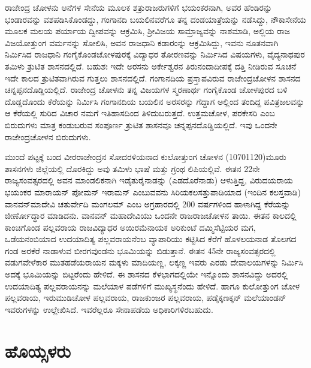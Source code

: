 ರಾಜೇಂದ್ರ ಚೋಳನು ಆನೆಗಳ ಸೇನೆಯ ಮೂಲಕ ಶತ್ರುರಾಜರುಗಳಿಗೆ ಭಯಂಕರನಾಗಿ, ಅವರ ಹೆಂಡಿರನ್ನು ಭಂಡಾರವನ್ನು ವಶಪಡಿಸಿಕೊಂಡದ್ದು, ಗಂಗಾನದಿ ಬಯಲಿನವರೆಗೂ ತನ್ನ ದಂಡಯಾತ್ರೆಯನ್ನು ನಡೆಸಿದ್ದು, ನೌಕಾಸೇನೆಯ ಮೂಲಕ ಮಲಯ ಪರ್ಯಾಯ ದ್ವೀಪವನ್ನು ಆಕ್ರಮಿಸಿ, ಶ‍್ರೀವಿಜಯ ಸಾಮ್ರಾಜ್ಯವನ್ನು ನಾಶಮಾಡಿ, ಅಲ್ಲಿಯ ರಾಜ ವಿಜಯೋತ್ತುಂಗ ವರ್ಮನನ್ನು ಸೋಲಿಸಿ, ಅವನ ರಾಜಧಾನಿ ಕಡಾರಂನ್ನು ಆಕ್ರಮಿಸಿದ್ದು, ಇವನು ನೂತನವಾಗಿ ನಿರ್ಮಿಸಿದ ರಾಜಧಾನಿ ಗಂಗೈಕೊಂಡಚೋಳಪುರಕ್ಕೆ ವಿದ್ಯಾಧರ ತೋರಣವನ್ನು ನಿರ್ಮಿಸಿದ ವಿಷಯಗಳು, ವೈದ್ಯನಾಥಪುರ ತಮಿಳು ತ್ರುಟಿತ ಶಾಸನ\-ದಲ್ಲಿದೆ. ಬಹುಶಃ ಇದೇ ಅರಸನು ಅರ್ಕೇಶ್ವರನ ತಿರುನಂದಾದೀಪಕ್ಕೆ ದತ್ತಿ ನೀಡಿರುವ ಸೂಚನೆ ಇದೇ ಕಾಲದ ತ್ರುಟಿತವಾಗಿರುವ ಗುತ್ತಲು ಶಾಸನದಲ್ಲಿದೆ. ಗಂಗಾನದಿಯ ಪ್ರಸ್ತಾಪವಿರುವ ರಾಜೇಂದ್ರಚೋಳನ ಶಾಸನದ ಚನ್ನಪ್ಪನದೊಡ್ಡಿಯಲ್ಲಿದೆ. ರಾಜೇಂದ್ರ ಚೋಳನು ತನ್ನ ವಿಜಯಗಳ ಸ್ಮರಣಾರ್ಥ ಗಂಗೈಕೊಂಡ ಚೋಳಪುರದ ಬಳಿ ದೊಡ್ಡದೊಂದು ಕೆರೆಯನ್ನು ನಿರ್ಮಿಸಿ ಗಂಗಾನದಿಯ ಬಯಲಿನ ಅರಸರನ್ನು ಗೆದ್ದಾಗ ಅಲ್ಲಿಂದ ತಂದಿದ್ದ ಪವಿತ್ರಜಲವನ್ನು ಆ ಕೆರೆಯಲ್ಲಿ ಸುರಿದ ವಿಚಾರ ನಮಗೆ ಇತಿಹಾಸದಿಂದ ತಿಳಿದುಬರುತ್ತದೆ. ಉತ್ತಮಚೋಳ, ಪರಕೇಸರಿ ಎಂಬ ಬಿರುದುಗಳು ಮಾತ್ರ ಕಂಡುಬರುವ ಸಂಪೂರ್ಣ ತ್ರುಟಿತ ಶಾಸನವೂ ಚನ್ನಪ್ಪನದೊಡ್ಡಿಯಲ್ಲಿದೆ. ಇವು ಒಂದನೇ ರಾಜೇಂದ್ರಚೋಳನ ಬಿರುದುಗಳು. 

ಮುಂದೆ ಪಟ್ಟಕ್ಕೆ ಬಂದ ವೀರರಾಜೇಂದ್ರನ ಸೋದರಳಿಯನಾದ ಕುಲೋತ್ತುಂಗ ಚೋಳನ (10701120)ಮೂರು ಶಾಸನಗಳು ಜಿಲ್ಲೆಯಲ್ಲಿ ದೊರಕಿದ್ದು ಅವು ತಮಿಳು ಭಾಷೆ ಮತ್ತು ಗ್ರಂಥ ಲಿಪಿಯಲ್ಲಿವೆ. ಈತನ 22ನೇ ರಾಜ್ಯಸಂವತ್ಸರದಲ್ಲಿ ಅವನ ಮಾಂಡಲಿಕನಾಗಿ ಇಡೈತುರೈನಾಡನ್ನು (ಎಡದೊರೆನಾಡು) ಆಳುತ್ತಿದ್ದ, ವಿರುದಯರಾಯ ಭಯಂಕರ ಮಾರಾಯನ್​ ಪೋಮನ್​ ಇರಾಮನ್​ ಎಂಬುವವನು ಸಿರಿಯಕಲಸತ್ತುಪಾಡಿಯಾದ (ಇಂದಿನ ಕಲಸ್ತವಾಡಿ) ವಾನವನ್​ಮಾದೇವಿ ಚತುರ್ವೇದಿ ಮಂಗಲಮ್ ಎಂಬ ಅಗ್ರಹಾರದಲ್ಲಿ 200 ವರ್ಷಗಳಿಂದ ಹಾಳಾಗಿದ್ದ ಕೆರೆಯನ್ನು ಜೀರ್ಣೋದ್ಧಾರ ಮಾಡಿದನು. ವಾನವನ್​ ಮಹಾದೇವಿಯು ಒಂದನೇ ರಾಜರಾಜಚೋಳನ ತಾಯಿ. ಈತನ ಕಾಲದಲ್ಲಿ ಕಾಂಚಿಗೊಂಡ ಪಲ್ಲವರಾಯ ರಾಜವಿದ್ಯಾಧರ ಅಯಿರಮೆನಾಯಕ ಅರಿಕುಂಟೆ ದಮ್ಮಿಸೆಟ್ಟಿಯರ ಮಗ, ಒಡೆಯನಂಬಿಯಾದ ಉದಯಾದಿತ್ಯ ಪಲ್ಲವರಾಯನೆಂಬ ವ್ಯಾಪಾರಿಯು ಕಟ್ಟಿಸಿದ ಕೆರೆಗೆ ಹೊಳಲಯನಾಡ ತೊಲಗದ ಗಂಡ ಅರಕೆರೆ ನಾಡಾಳುವ ಬೀರಗವುಂಡನು ಭೂಮಿಯನ್ನು ಬಿಡುತ್ತಾನೆ. ಈತನ 45ನೇ ರಾಜ್ಯಸಂವತ್ಸರದಲ್ಲಿ ವಡುಗವೇಳೆಕಾರ ಮುತಹಡೆಯರಾಯನ ಮಕ್ಕಳು ಮಾದಿಯಣ್ಣ, ಲಕ್ಕಣ್ಣ ಇವರು ಎರಡು ದೇವಾಲಯಗಳನ್ನು ನಿರ್ಮಿಸಿ ಅದಕ್ಕೆ ಭೂಮಿಯನ್ನು ಬಿಟ್ಟರೆಂದು ಹೇಳಿದೆ. ಈ ಶಾಸನದ ಕೆಳಭಾಗದಲ್ಲಿಯೇ ಇನ್ನೊಂದು ಶಾಸನವಿದ್ದು ಅದರಲ್ಲಿ ಉದಯಾದಿತ್ಯ ಪಲ್ಲವರಾಯನನ್ನು ಮಲೆಯಾಳ ಪಡೆಗಳಿಗೆ ಮುಖ್ಯಸ್ಥನೆಂದು ಹೇಳಿದೆ. ಹಾಗೂ ಕುಲೋತ್ತುಂಗ ಚೋಳ ಪಲ್ಲವರಾಯ, ಇರುಮುಡಿಚೋಳ ಪಲ್ಲವರಾಯ, ರಾಜಕುಂಜರ ಪಲ್ಲವರಾಯ, ಪಡೈಕ್ಕಣಕ್ಕನ್​ ಮಲೆಯಾಂಡನ್​ ಇವರುಗಳನ್ನು ಉಲ್ಲೇಖಿಸಿದೆ. ಇವರೆಲ್ಲರೂ ಸೇನಾಪಡೆಯ ಅಧಿಕಾರಿಗಳಿರಬಹುದು.


\section{ಹೊಯ್ಸಳರು}


